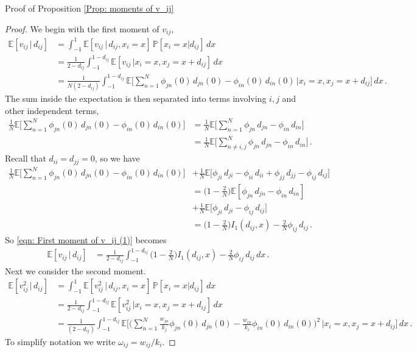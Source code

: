 \documentclass{article}
\newcommand{\EE}{\mathds{E}}
\begin{document}
Proof of Proposition \ref{Prop: moments of v_ij}
\begin{proof}
    We begin with the first moment of $v_{ij}$,
    \begin{align}
        \EE[v_{ij}\,|\,d_{ij}] &= \int_{-1}^{1} \EE[v_{ij}\,|\,d_{ij}, x_i = x] \, \mathbb{P}[x_i = x | d_{ij}] \, dx \nonumber\\
        &= \frac{1}{2-d_{ij}}\int_{-1}^{1-d_{ij}} \EE[v_{ij}\,|x_i = x, x_j = x+d_{ij}] \, dx \nonumber\\
        &= \frac{1}{N(2-d_{ij})}\int_{-1}^{1-d_{ij}} \EE\Bigg[\sum_{n=1}^N \phi_{jn}(0) \, d_{jn}(0) - \phi_{in}(0) \, d_{in}(0)\,\bigg|x_i = x, x_j = x+d_{ij}\Bigg] \, dx \,. \label{eqn: First moment of v_ij (1)}
    \end{align}
    The sum inside the expectation is then separated into terms involving $i,j$ and other independent terms, 
    \begin{align*}
        \frac{1}{N}\EE\Bigg[\sum_{n=1}^N \phi_{jn}(0) \, d_{jn}(0) - \phi_{in}(0) \, d_{in}(0)\Bigg]
        &= \frac{1}{N}\EE\Bigg[\sum_{n=1}^N \phi_{jn} \, d_{jn} - \phi_{in} \, d_{in}\Bigg] \\
        &= \frac{1}{N}\EE\Bigg[\sum_{n\neq i,j}^N \phi_{jn} \, d_{jn} - \phi_{in} \, d_{in}\Bigg] \,.
    \end{align*}
    Recall that $d_{ii} = d_{jj} = 0$, so we have 
    \begin{align*}
    \frac{1}{N}\EE\Bigg[\sum_{n=1}^N \phi_{jn}(0) \, d_{jn}(0) - \phi_{in}(0) \, d_{in}(0)\Bigg]
        &+ \frac{1}{N}\EE\Bigg[\phi_{ji} \, d_{ji} - \phi_{ii} \, d_{ii} + \phi_{jj} \, d_{jj} - \phi_{ij} \, d_{ij}\Bigg] \\
        &= \Big(1-\frac{2}{N}\Big) \EE[\phi_{jn} \, d_{jn} - \phi_{in} \, d_{in}] \\
        &+ \frac{1}{N}\EE\Bigg[\phi_{ji} \, d_{ji} - \phi_{ij} \, d_{ij}\Bigg] \\
        &= \Big(1-\frac{2}{N}\Big) I_1(d_{ij},x) - \frac{2}{N}\phi_{ij} \, d_{ij}\,.
    \end{align*}
    So \eqref{eqn: First moment of v_ij (1)} becomes
    \begin{align*}
        \EE[v_{ij}\,|\,d_{ij}] &= \frac{1}{2-d_{ij}}\int_{-1}^{1-d_{ij}} \Big(1-\frac{2}{N}\Big) I_1(d_{ij},x) - \frac{2}{N}\phi_{ij} \, d_{ij} \, dx \,.
    \end{align*}
    Next we consider the second moment.
    \begin{align*}
        \EE[v_{ij}^2\,|\,d_{ij}] 
        &= \int_{-1}^{1} \EE[v_{ij}^2\,|\,d_{ij}, x_i = x] \, \mathbb{P}[x_i = x | d_{ij}] \, dx \\
        &= \frac{1}{2-d_{ij}}\int_{-1}^{1-d_{ij}} \EE[v_{ij}^2\,|x_i = x, x_j = x+d_{ij}] \, dx \\
        &= \frac{1}{(2-d_{ij})}\int_{-1}^{1-d_{ij}} \EE\Bigg[\bigg(\sum_{n=1}^N \frac{w_{jn}}{k_j}\phi_{jn}(0) \, d_{jn}(0) - \frac{w_{in}}{k_i}\phi_{in}(0) \, d_{in}(0)\bigg)^2\,\bigg|x_i = x, x_j = x+d_{ij}\Bigg] \, dx \,.
    \end{align*} 
    To simplify notation we write $\omega_{ij} = w_{ij}/k_i$. 
    

\end{proof}
\end{document}
